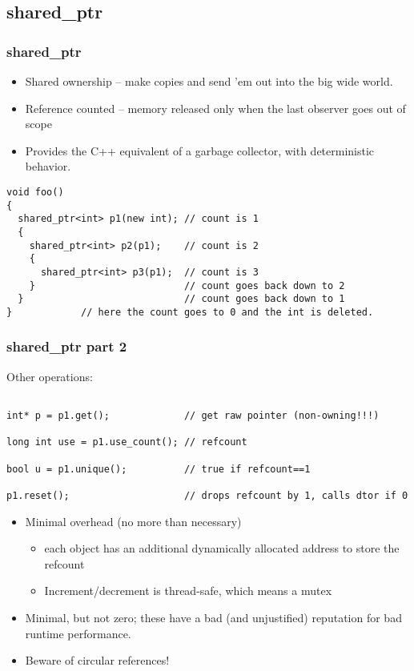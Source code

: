 \subsection{shared\_ptr}


\begin{frame}[fragile]
\frametitle{shared\_ptr}
\begin{itemize}
\item Shared ownership -- make copies and send 'em out into the big wide
world.

\item Reference counted -- memory released only when the last observer
goes out of scope

\item Provides the C++ equivalent of a garbage collector, with
  deterministic behavior.

\end{itemize}

{\scriptsize\begin{verbatim}
void foo() 
{  
  shared_ptr<int> p1(new int); // count is 1
  {
    shared_ptr<int> p2(p1);    // count is 2
    {
      shared_ptr<int> p3(p1);  // count is 3
    }                          // count goes back down to 2
  }                            // count goes back down to 1
}            // here the count goes to 0 and the int is deleted.
\end{verbatim}}

\end{frame}



\begin{frame}[fragile]
\frametitle{shared\_ptr part 2}

Other operations:
{\scriptsize\begin{verbatim}

int* p = p1.get();             // get raw pointer (non-owning!!!)

long int use = p1.use_count(); // refcount

bool u = p1.unique();          // true if refcount==1

p1.reset();                    // drops refcount by 1, calls dtor if 0
\end{verbatim}
}



\begin{itemize}
\pause{}
\item Minimal overhead (no more than necessary)
\begin{itemize}
  \item each object has an additional dynamically allocated address to
    store the refcount
  \item Increment/decrement is thread-safe, which means a mutex
\end{itemize}
\pause{}
\item Minimal, but not zero; these have a bad (and unjustified)
  reputation for bad runtime performance.
\vskip 12pt
\pause{}
\item Beware of circular references!
\end{itemize}
\end{frame}

